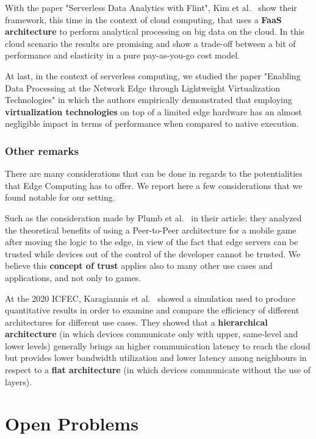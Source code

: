 With the paper "Serverless Data Analytics with Flint", Kim et al.~\cite{serverless-analytics-cloud} show their framework, this time in the context  of cloud computing, that uses a \textbf{FaaS architecture} to perform analytical processing on big data on the cloud. In this cloud scenario the results are promising and show a trade-off between a bit of performance and elasticity in a pure pay-as-you-go cost model.

At last, in the context of serverless computing, we studied the paper "Enabling Data Processing at the Network Edge through Lightweight Virtualization Technologies" \cite{lightweight-virtualization} in which the authors empirically demonstrated that employing \textbf{virtualization technologies} on top of a limited edge hardware has an almost negligible impact in terms of performance when compared to native execution.


\subsubsection{Other remarks}
There are many considerations that can be done in regards to the potentialities that Edge Computing has to offer.
We report here a few considerations that we found notable for our setting.

Such as the consideration made by Plumb et al.~\cite{google-edge-for-mmog} in their article: they analyzed the theoretical benefits of using a Peer-to-Peer architecture for a mobile game after moving the logic to the edge, in view of the fact that edge servers can be trusted while devices out of the control of the developer cannot be trusted.
We believe this \textbf{concept of trust} applies also to many other use cases and applications, and not only to games.

At the 2020 ICFEC, Karagiannis et al.~\cite{architecture-comparison} showed a simulation used to produce quantitative results in order to examine and compare the efficiency of different architectures for different use cases. They showed that a \textbf{hierarchical architecture} (in which devices communicate only with upper, same-level and lower levels) generally brings an higher communication latency to reach the cloud but provides lower bandwidth utilization and lower latency among neighbours in respect to a \textbf{flat architecture} (in which devices communicate without the use of layers).



\section{Open Problems}
\label{sec:open_problems}

